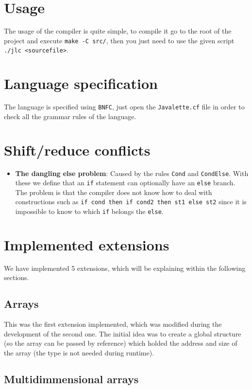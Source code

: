 \documentclass{article}
\begin{document}
\section{Usage}
The usage of the compiler is quite simple, to compile it go to the root of the project and execute \texttt{make -C src/}, then you just need to use the given script \texttt{./jlc <sourcefile>}.

\section{Language specification}
The language is specified using \texttt{BNFC}, just open the \texttt{Javalette.cf} file in order to check all the grammar rules of the language.

\section{Shift/reduce conflicts}

\begin{itemize}
  \item {\bf The dangling else problem}: Caused by the rules \texttt{Cond} and \texttt{CondElse}. With these we define that an \texttt{if} statement can optionally have an \texttt{else} branch. The problem is that the compiler does not know how to deal with constructions such as \texttt{if cond then if cond2 then st1 else st2} since it is impossible to know to which \texttt{if} belongs the \texttt{else}.
\end{itemize}

\section{Implemented extensions}

We have implemented 5 extensions, which will be explaining within the following sections.

\subsection{Arrays}

This was the first extension implemented, which was modified during the development of the second one. The initial idea was to create a global structure (so the array can be passed by reference) which holded the address and size of the array (the type is not needed during runtime).
\subsection{Multidimmensional arrays}
\end{document}
